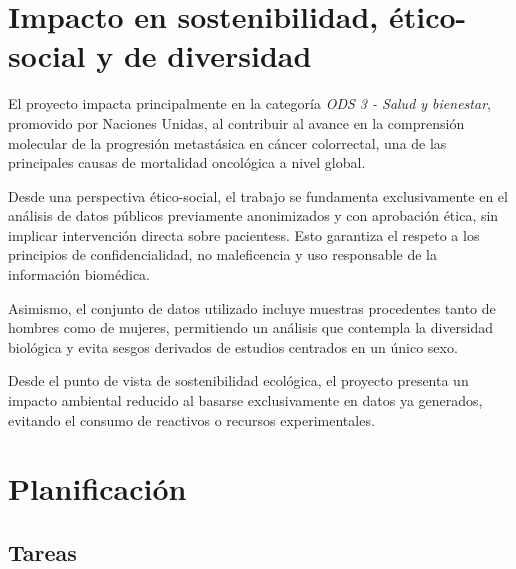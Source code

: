 \documentclass[11pt]{article}
\begin{document}
	\section{Impacto en sostenibilidad, ético-social y de diversidad}
		
		El proyecto impacta principalmente en la categoría \textit{ODS 3 - Salud y bienestar}, promovido por Naciones Unidas\footnotemark, al contribuir al avance en la comprensión molecular de la progresión metastásica en cáncer colorrectal, una de las principales causas de mortalidad oncológica a nivel global.
		
		
		Desde una perspectiva ético-social, el trabajo se fundamenta exclusivamente en el análisis de datos públicos previamente anonimizados y con aprobación ética, sin implicar intervención directa sobre pacientess. Esto garantiza el respeto a los principios de confidencialidad, no maleficencia y uso responsable de la información biomédica.
		
		Asimismo, el conjunto de datos utilizado incluye muestras procedentes tanto de hombres como de mujeres, permitiendo un análisis que contempla la diversidad biológica y evita sesgos derivados de estudios centrados en un único sexo.
		
		Desde el punto de vista de sostenibilidad ecológica, el proyecto presenta un impacto ambiental reducido al basarse exclusivamente en datos ya generados, evitando el consumo de reactivos o recursos experimentales.
		
		
		
		
	\section{Planificación}
		\subsection{Tareas}
		
\end{document}

